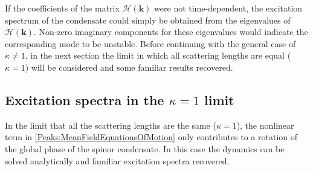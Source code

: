 If the coefficients of the matrix $\mathcal{H}(\bm{k})$ were not time-dependent, the excitation spectrum of the condensate could simply be obtained from the eigenvalues of $\mathcal{H}(\bm{k})$. Non-zero imaginary components for these eigenvalues would indicate the corresponding mode to be unstable. Before continuing with the general case of $\kappa \neq 1$, in the next section the limit in which all scattering lengths are equal ($\kappa=1$) will be considered and some familiar results recovered.

\subsection{Excitation spectra in the $\kappa = 1$ limit}
\label{Peaks:Kappa1Limit}
In the limit that all the scattering lengths are the same ($\kappa = 1$), the nonlinear term in \eqref{Peaks:MeanFieldEquationsOfMotion} only contributes to a rotation of the global phase of the spinor condensate. In this case the dynamics can be solved analytically and familiar excitation spectra recovered.

